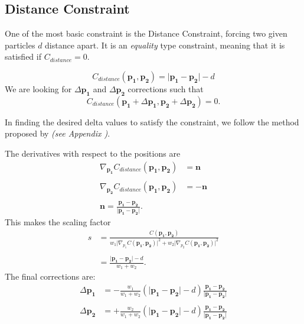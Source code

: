 \documentclass[sigplan,screen,nonacm]{acmart}
\renewcommand{\b}{\boldsymbol}
\begin{document}
\subsection{Distance Constraint} \label{section:DistanceConstraint}
One of the most basic constraint is the Distance Constraint, forcing two given
particles $d$ distance apart. It is an \emph{equality} type constraint, meaning
that it is satisfied if $C_{distance} = 0$.

\begin{equation} \label{eq:distance_constraint}
C_{distance}(\b{p_1},\b{p_2}) = \lvert \b{p_1} - \b{p_2} \rvert - d
\end{equation}
We are looking for $\Delta \b{p_1}$ and $\Delta \b{p_2}$ corrections such that 
$$
C_{distance}(\b{p_1}+\Delta \b{p_1}, \b{p_2}+\Delta \b{p_2}) = 0.
$$

In finding the desired delta values to satisfy the constraint, we follow the
method proposed by \citet{MullerPBD} \emph{(see Appendix
 )}.

The derivatives with respect to the positions are
\begin{align*}
    \nabla_{\b{p_1}} C_{distance}(\b{p_1}, \b{p_2}) &= \b{n} \\\\
    \nabla_{\b{p_2}} C_{distance}(\b{p_1}, \b{p_2}) &= -\b{n} \\\\
    \b{n} = \frac{\b{p_1}-\b{p_2}}{\lvert \b{p_1}-\b{p_2} \rvert}.
\end{align*}
This makes the scaling factor 
\begin{align*}
    s &= \frac{C(\b{p_1},\b{p_2})}
{w_1 \lvert \nabla_{p_1}C(\b{p_1}, \b{p_2})\rvert ^ 2 + w_2 \lvert
\nabla_{p_2}C(\b{p_1}, \b{p_2})\rvert ^ 2}\\\\
    &= \frac{\lvert \b{p_1} - \b{p_2}\rvert - d}{w_1 + w_2}.
\end{align*}
The final corrections are:
\begin{align*}
    \Delta \b{p_1} &= - \frac{w_1}{w_1 + w_2}
    (\lvert \b{p_1} - \b{p_2} \rvert - d) 
    \frac{\b{p_1} - \b{p_2}}{\lvert \b{p_1} - \b{p_2} \rvert} 
    \\\\
    \Delta \b{p_2} &= + \frac{w_2}{w_1 + w_2}
    (\lvert \b{p_1} - \b{p_2} \rvert - d) 
    \frac{\b{p_1} - \b{p_2}}{\lvert \b{p_1} - \b{p_2} \rvert}
\end{align*}
\end{document}
